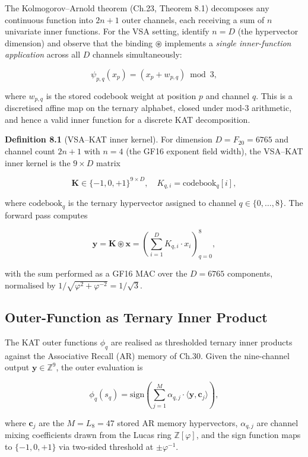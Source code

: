 The Kolmogorov--Arnold theorem (Ch.23, Theorem
8.1) decomposes any continuous function into
\(2n+1\) outer channels, each receiving a sum of
\(n\) univariate inner functions. For the VSA
setting, identify \(n = D\) (the hypervector
dimension) and observe that the binding
\(\circledast\) implements a \emph{single inner-function
application} across all \(D\) channels simultaneously:

\[
\psi_{p,q}(x_p) = (x_p + w_{p,q}) \bmod 3,
\]

where \(w_{p,q}\) is the stored codebook weight at
position \(p\) and channel \(q\). This is a
discretised affine map on the ternary alphabet,
closed under mod-3 arithmetic, and hence a valid
inner function for a discrete KAT decomposition.

\textbf{Definition 8.1} (VSA--KAT inner kernel).
For dimension \(D = F_{20} = 6765\) and channel
count \(2n+1\) with \(n = 4\) (the GF16 exponent
field width), the VSA--KAT inner kernel is the
\(9 \times D\) matrix

\[
\mathbf{K} \in \{-1, 0, +1\}^{9 \times D}, \quad K_{q,i} = \mathrm{codebook}_q[i],
\]

where \(\mathrm{codebook}_q\) is the ternary
hypervector assigned to channel \(q \in \{0,\ldots,8\}\).
The forward pass computes

\[
\mathbf{y} = \mathbf{K} \circledast \mathbf{x} = \left(\sum_{i=1}^{D} K_{q,i} \cdot x_i\right)_{q=0}^{8},
\]

with the sum performed as a GF16 MAC over the
\(D = 6765\) components, normalised by
\(1/\sqrt{\varphi^2 + \varphi^{-2}} = 1/\sqrt{3}\).

\subsection{Outer-Function as Ternary Inner
Product}\label{fa_24:outer-function-ternary}

The KAT outer functions \(\phi_q\) are realised as
thresholded ternary inner products against the
Associative Recall (AR) memory of Ch.30. Given the
nine-channel output \(\mathbf{y} \in
\mathbb{Z}^9\), the outer evaluation is

\[
\phi_q(s_q) = \mathrm{sign}\!\left(\sum_{j=1}^{M} \alpha_{q,j} \cdot \langle \mathbf{y}, \mathbf{c}_j \rangle\right),
\]

where \(\mathbf{c}_j\) are the \(M = L_8 = 47\)
stored AR memory hypervectors, \(\alpha_{q,j}\) are
channel mixing coefficients drawn from the Lucas
ring \(\mathbb{Z}[\varphi]\), and the sign function
maps to \(\{-1, 0, +1\}\) via two-sided threshold
at \(\pm \varphi^{-1}\).

